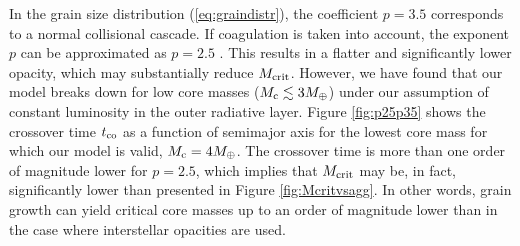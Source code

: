 \documentclass[apj]{emulateapj}
\newcommand{\co}{_{\rm c}}
\begin{document}
In the grain size distribution (\ref{eq:graindistr}), the coefficient $p=3.5$ corresponds to a normal collisional cascade. If coagulation is taken into account, the exponent $p$ can be approximated as $p=2.5$ \citep{dalessio01}. This results in a flatter and significantly lower opacity, which may substantially reduce $M_{\rm crit}$. However, we have found that our model breaks down for low core masses ($M\co \lesssim 3 M_{\oplus}$) under our assumption of constant luminosity in the outer radiative layer. Figure \ref{fig:p25p35} shows the crossover time $t_{\rm co}$ as a function of semimajor axis for the lowest core mass for which our model is valid, $M\co=4 M_{\oplus}$. The crossover time is more than one order of magnitude lower for $p=2.5$, which implies that $M_{\rm crit}$ may be, in fact, significantly lower than presented in Figure \ref{fig:Mcritvsagg}. In other words, grain growth can yield critical core masses up to an order of magnitude lower than in the case where interstellar opacities are used.




\end{document}
